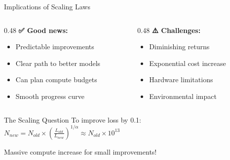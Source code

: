 \documentclass[aspectratio=169]{beamer}
\begin{document}
\begin{frame}[shrink=10]{Implications of Scaling Laws 🎯}
    \begin{columns}[T]
        \begin{column}{0.48\textwidth}
            \textbf{✅ Good news:}
            \begin{itemize}\setlength{\itemsep}{0pt}
                \item Predictable improvements
                \item Clear path to better models
                \item Can plan compute budgets
                \item Smooth progress curve
            \end{itemize}
        \end{column}

        \begin{column}{0.48\textwidth}
            \textbf{⚠️ Challenges:}
            \begin{itemize}\setlength{\itemsep}{0pt}
                \item Diminishing returns
                \item Exponential cost increase
                \item Hardware limitations
                \item Environmental impact
            \end{itemize}
        \end{column}
    \end{columns}

    \vspace{0.5cm}

    \begin{alertblock}{The Scaling Question}
        To improve loss by 0.1: \\
        $N_{new} = N_{old} \times \left(\frac{L_{old}}{L_{new}}\right)^{1/\alpha} \approx N_{old} \times 10^{13}$

        \vspace{0.3cm}

        Massive compute increase for small improvements!
    \end{alertblock}
\end{frame}
\end{document}
